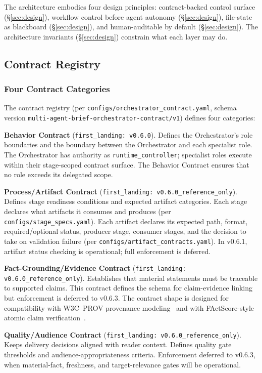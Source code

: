 \documentclass[11pt,a4paper]{article}
\begin{document}
The architecture embodies four design principles: contract-backed control surface (\S\ref{sec:design}), workflow control before agent autonomy (\S\ref{sec:design}), file-state as blackboard (\S\ref{sec:design}), and human-auditable by default (\S\ref{sec:design}). The architecture invariants (\S\ref{sec:design}) constrain what each layer may do.

\subsection{Contract Registry}

\subsubsection{Four Contract Categories}

The contract registry (per \texttt{configs/orchestrator\_contract.yaml}, schema version \texttt{multi-agent-brief-orchestrator-contract/v1}) defines four categories:

\textbf{Behavior Contract} (\texttt{first\_landing: v0.6.0}). Defines the Orchestrator's role boundaries and the boundary between the Orchestrator and each specialist role. The Orchestrator has authority as \texttt{runtime\_controller}; specialist roles execute within their stage-scoped contract surface. The Behavior Contract ensures that no role exceeds its delegated scope.

\textbf{Process/Artifact Contract} (\texttt{first\_landing: v0.6.0\_reference\_only}). Defines stage readiness conditions and expected artifact categories. Each stage declares what artifacts it consumes and produces (per \texttt{configs/stage\_specs.yaml}). Each artifact declares its expected path, format, required/optional status, producer stage, consumer stages, and the decision to take on validation failure (per \texttt{configs/artifact\_contracts.yaml}). In v0.6.1, artifact status checking is operational; full enforcement is deferred.

\textbf{Fact-Grounding/Evidence Contract} (\texttt{first\_landing: v0.6.0\_reference\_only}). Establishes that material statements must be traceable to supported claims. This contract defines the schema for claim-evidence linking but enforcement is deferred to v0.6.3. The contract shape is designed for compatibility with W3C~PROV provenance modeling~\cite{w3c_prov} and with FActScore-style atomic claim verification~\cite{min2023factscore}.

\textbf{Quality/Audience Contract} (\texttt{first\_landing: v0.6.0\_reference\_only}). Keeps delivery decisions aligned with reader context. Defines quality gate thresholds and audience-appropriateness criteria. Enforcement deferred to v0.6.3, when material-fact, freshness, and target-relevance gates will be operational.
\end{document}
